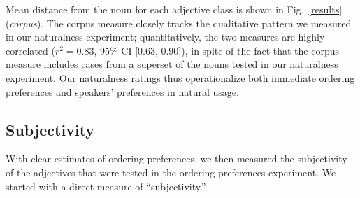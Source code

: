 \documentclass[manuscript]{stjour}
\begin{document}
Mean distance from the noun for each adjective class is shown in Fig.~\ref{results} (\emph{corpus}).
The corpus measure closely tracks the qualitative pattern we measured in our naturalness experiment; quantitatively, the two measures are highly correlated ($r^{2}=0.83$, 95\% CI [0.63, 0.90]), in spite of the fact that the corpus measure includes cases from a superset of the nouns tested in our naturalness experiment. Our naturalness ratings thus operationalize both immediate ordering preferences and speakers' preferences in natural usage.



\subsection{Subjectivity}

With clear estimates of ordering preferences, we then measured the subjectivity of the adjectives that were tested in the ordering preferences experiment. We started with a direct measure of ``subjectivity.''
\end{document}
